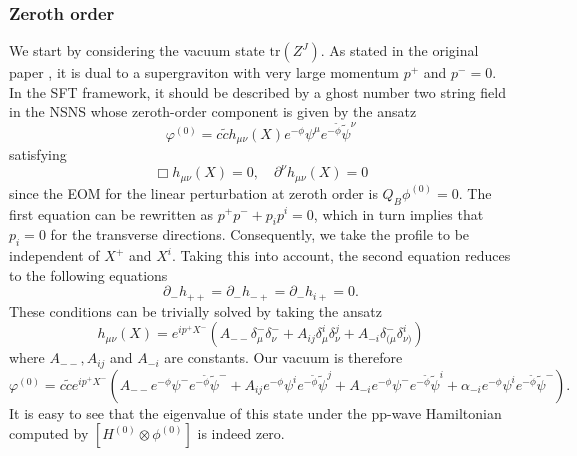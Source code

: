 \documentclass[12pt]{article}
\numberwithin{equation}{section}
\newcommand{\WT}[1]{\widetilde{#1}}
\begin{document}
\subsubsection{Zeroth order}
We start by considering the vacuum state $\mathrm{tr}(Z^J)$. As stated in the original paper \cite{Berenstein:2002jq}, it is dual to a supergraviton with very large momentum $p^+$ and $p^-=0$. In the SFT framework, it should be described by a ghost number two string field in the NSNS whose zeroth-order component is given by the ansatz
\begin{equation}
    \varphi^{(0)}=c\WT{c}h_{\mu\nu}(X)e^{-\phi}\psi^{\mu}e^{-\WT{\phi}}\WT{\psi}^{\nu}
\end{equation}
satisfying
\begin{equation}
    \Box h_{\mu\nu}(X)=0,\quad \partial^{\nu}h_{\mu\nu}(X)=0
\end{equation}
since the EOM for the linear perturbation at zeroth order is $Q_B\phi^{(0)}=0$. The first equation can be rewritten as $p^+p^-+p_ip^i=0$, which in turn implies that $p_i=0$ for the transverse directions. Consequently, we take the profile to be independent of $X^+$ and $X^i$. Taking this into account, the second equation reduces to the following equations
\begin{equation}
    \partial_- h_{++}=\partial_- h_{-+} = \partial_- h_{i+}=0.
\end{equation}
These conditions can be trivially solved by taking the ansatz
\begin{equation}
    h_{\mu\nu}(X)=e^{ip^+X^-}\left(A_{--}\delta_{\mu}^{-}\delta_{\nu}^{-}+A_{ij}\delta_{\mu}^i\delta_{\nu}^j+A_{-i}\delta_{(\mu}^-\delta_{\nu)}^i\right)
\end{equation}
where $A_{--},A_{ij}$ and $A_{-i}$ are constants. Our vacuum is therefore
\begin{equation} \label{Grav0}
    \varphi^{(0)}=c\WT{c}e^{ip^+X^-}\left( A_{--} e^{-\phi}\psi^-e^{-\WT{\phi}}\WT{\psi}^-+A_{ij}e^{-\phi}\psi^ie^{-\WT{\phi}}\WT{\psi}^j+A_{-i}e^{-\phi}\psi^-e^{-\WT{\phi}}\WT{\psi}^i+\alpha_{-i}e^{-\phi}\psi^ie^{-\WT{\phi}}\WT{\psi}^-\right).
\end{equation}
It is easy to see that the eigenvalue of this state under the pp-wave Hamiltonian computed by $\left[H^{(0)}\otimes\phi^{(0)}\right]$ is indeed zero. 
\end{document}
